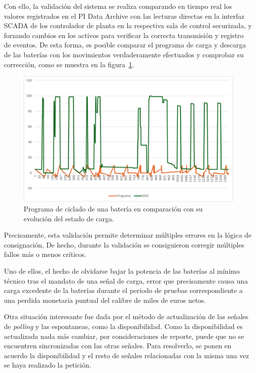 Con ello, la validación del sistema se realiza comparando en tiempo real los valores registrados en el PI Data Archive con las lecturas directas en la interfaz SCADA de los controlador de planta en la respectiva sala de control securizada, y forzando cambios en los activos para verificar la correcta transmisión y registro de eventos. De esta forma, es posible comparar el programa de carga y descarga de las baterías con los movimientos verdaderamente efectuados y comprobar su corrección, como se muestra en la figura~\ref{fig:programa-bateria}.

\begin{figure}
  \centering
  \includegraphics[width=0.75\linewidth]{figures/programa-bateria.png}
  \caption[Programa de ciclado de una batería.]{Programa de ciclado de una batería en comparación con su evolución del estado de carga.}
  \label{fig:programa-bateria}
\end{figure}

Precisamente, esta validación permite determinar múltiples errores en la lógica de consignación, De hecho, durante la validación se consiguieron corregir múltiples fallos más o menos críticos.

Uno de ellos, el hecho de olvidarse bajar la potencia de las baterías al mínimo técnico tras el mandato de una señal de carga, error que precisamente causa una carga excedente de la baterías durante el periodo de pruebas correspondiente a una perdida monetaria puntual del calibre de miles de euros netos.

Otra situación interesante fue dada por el método de actualización de las señales de \textit{polling} y las espontaneas, como la disponibilidad. Como la disponibilidad es actualizada nada más cambiar, por consideraciones de reporte, puede que no se encuentren sincronizadas con las otras señales. Para resolverlo, se ponen en acuerdo la disponibilidad y el resto de señales relacionadas con la misma una vez se haya realizado la petición.

